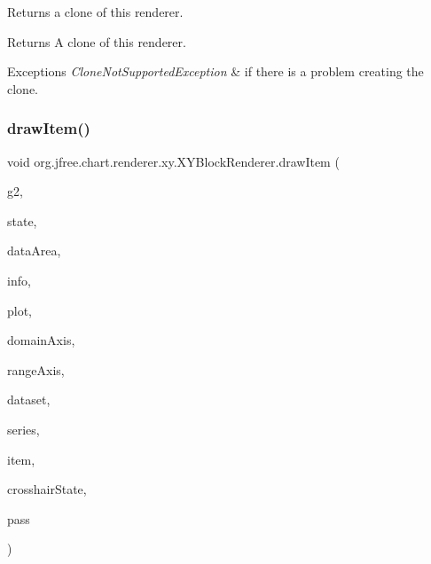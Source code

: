 Returns a clone of this renderer.

\begin{DoxyReturn}{Returns}
A clone of this renderer.
\end{DoxyReturn}

\begin{DoxyExceptions}{Exceptions}
{\em Clone\+Not\+Supported\+Exception} & if there is a problem creating the clone. \\
\hline
\end{DoxyExceptions}
\mbox{\label{classorg_1_1jfree_1_1chart_1_1renderer_1_1xy_1_1_x_y_block_renderer_af40c39c5522bd7a9918570026243fe05}} 
\subsubsection{\texorpdfstring{draw\+Item()}{drawItem()}}
{\footnotesize\ttfamily void org.\+jfree.\+chart.\+renderer.\+xy.\+X\+Y\+Block\+Renderer.\+draw\+Item (\begin{DoxyParamCaption}\item[{Graphics2D}]{g2,  }\item[{\mbox{\hyperlink{classorg_1_1jfree_1_1chart_1_1renderer_1_1xy_1_1_x_y_item_renderer_state}{X\+Y\+Item\+Renderer\+State}}}]{state,  }\item[{Rectangle2D}]{data\+Area,  }\item[{\mbox{\hyperlink{classorg_1_1jfree_1_1chart_1_1plot_1_1_plot_rendering_info}{Plot\+Rendering\+Info}}}]{info,  }\item[{\mbox{\hyperlink{classorg_1_1jfree_1_1chart_1_1plot_1_1_x_y_plot}{X\+Y\+Plot}}}]{plot,  }\item[{\mbox{\hyperlink{classorg_1_1jfree_1_1chart_1_1axis_1_1_value_axis}{Value\+Axis}}}]{domain\+Axis,  }\item[{\mbox{\hyperlink{classorg_1_1jfree_1_1chart_1_1axis_1_1_value_axis}{Value\+Axis}}}]{range\+Axis,  }\item[{\mbox{\hyperlink{interfaceorg_1_1jfree_1_1data_1_1xy_1_1_x_y_dataset}{X\+Y\+Dataset}}}]{dataset,  }\item[{int}]{series,  }\item[{int}]{item,  }\item[{\mbox{\hyperlink{classorg_1_1jfree_1_1chart_1_1plot_1_1_crosshair_state}{Crosshair\+State}}}]{crosshair\+State,  }\item[{int}]{pass }\end{DoxyParamCaption})}

